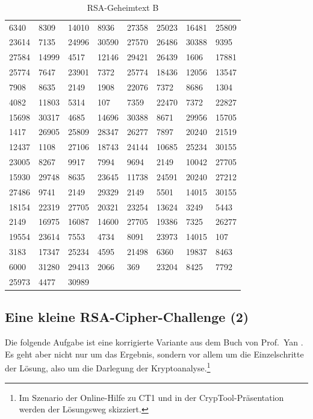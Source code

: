 \begin{refsegment}
\begin{table}[ht]
{\tt
\begin{tabular}{llllllll}
 6340  & 8309 & 14010  & 8936 & 27358 & 25023 & 16481 & 25809\\
23614  & 7135 & 24996 & 30590 & 27570 & 26486 & 30388  & 9395\\
27584 & 14999  & 4517 & 12146 & 29421 & 26439  & 1606 & 17881\\
25774  & 7647 & 23901  & 7372 & 25774 & 18436 & 12056 & 13547\\
 7908  & 8635  & 2149  & 1908 & 22076  & 7372  & 8686  & 1304\\
 4082 & 11803  & 5314   & 107  & 7359 & 22470  & 7372 & 22827\\
15698 & 30317  & 4685 & 14696 & 30388  & 8671 & 29956 & 15705\\
 1417 & 26905 & 25809 & 28347 & 26277  & 7897 & 20240 & 21519\\
12437  & 1108 & 27106 & 18743 & 24144 & 10685 & 25234 & 30155\\
23005  & 8267  & 9917  & 7994  & 9694  & 2149 & 10042 & 27705\\
15930 & 29748  & 8635 & 23645 & 11738 & 24591 & 20240 & 27212\\
27486  & 9741  & 2149 & 29329  & 2149  & 5501 & 14015 & 30155\\
18154 & 22319 & 27705 & 20321 & 23254 & 13624  & 3249  & 5443\\
 2149 & 16975 & 16087 & 14600 & 27705 & 19386  & 7325 & 26277\\
19554 & 23614  & 7553  & 4734  & 8091 & 23973 & 14015   & 107\\
 3183 & 17347 & 25234  & 4595 & 21498  & 6360 & 19837  & 8463\\
 6000 & 31280 & 29413  & 2066   & 369 & 23204  & 8425  & 7792\\
25973  & 4477 & 30989
\end{tabular} } %
\caption{RSA-Geheimtext B}
\label{stinson2}
\end{table}


\subsection{Eine kleine RSA-Cipher-Challenge (2)}

Die folgende Aufgabe ist eine korrigierte Variante aus dem Buch
von Prof.~Yan \cite[Example 3.3.7, S. 318]{Yan2000}. 
Es geht aber nicht nur um das Ergebnis, sondern vor allem um die
Einzelschritte der Lösung, also um die Darlegung der
Kryptoanalyse.\footnote{%
  Im Szenario der Online-Hilfe zu CT1 und in der
  CrypTool-Präsentation werden der Lösungsweg skizziert.
}


\end{refsegment}
